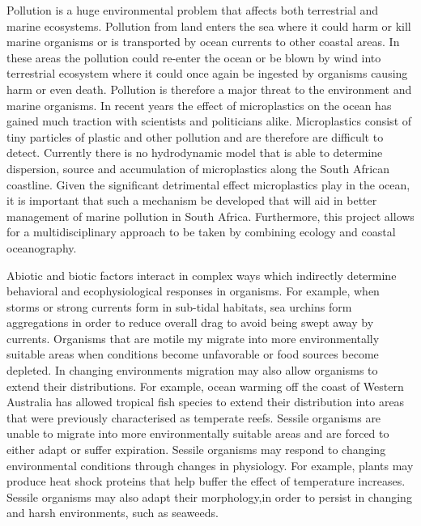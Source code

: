 \documentclass[
]{article}
\begin{document}
Pollution is a huge environmental problem that affects both terrestrial
and marine ecosystems. Pollution from land enters the sea where it could
harm or kill marine organisms or is transported by ocean currents to
other coastal areas. In these areas the pollution could re-enter the
ocean or be blown by wind into terrestrial ecosystem where it could once
again be ingested by organisms causing harm or even death. Pollution is
therefore a major threat to the environment and marine organisms. In
recent years the effect of microplastics on the ocean has gained much
traction with scientists and politicians alike. Microplastics consist of
tiny particles of plastic and other pollution and are therefore are
difficult to detect. Currently there is no hydrodynamic model that is
able to determine dispersion, source and accumulation of microplastics
along the South African coastline. Given the significant detrimental
effect microplastics play in the ocean, it is important that such a
mechanism be developed that will aid in better management of marine
pollution in South Africa. Furthermore, this project allows for a
multidisciplinary approach to be taken by combining ecology and coastal
oceanography.

Abiotic and biotic factors interact in complex ways which indirectly
determine behavioral and ecophysiological responses in organisms. For
example, when storms or strong currents form in sub-tidal habitats, sea
urchins form aggregations in order to reduce overall drag to avoid being
swept away by currents. Organisms that are motile my migrate into more
environmentally suitable areas when conditions become unfavorable or
food sources become depleted. In changing environments migration may
also allow organisms to extend their distributions. For example, ocean
warming off the coast of Western Australia has allowed tropical fish
species to extend their distribution into areas that were previously
characterised as temperate reefs. Sessile organisms are unable to
migrate into more environmentally suitable areas and are forced to
either adapt or suffer expiration. Sessile organisms may respond to
changing environmental conditions through changes in physiology. For
example, plants may produce heat shock proteins that help buffer the
effect of temperature increases. Sessile organisms may also adapt their
morphology,in order to persist in changing and harsh environments, such
as seaweeds.
\end{document}
